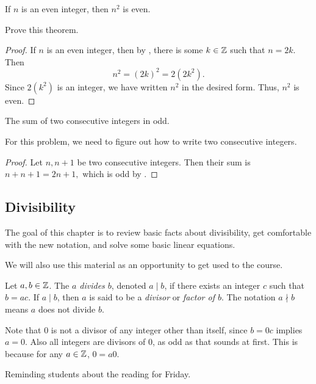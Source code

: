\documentclass{../ximera}
\begin{document}
 
\begin{thm*}\label{thm:even-sq}
  If $n$ is an even integer, then $n^2$ is even.
\end{thm*}

\begin{br}\label{br:sqr-evens}
  Prove this theorem.

  \begin{proof}
    If $n$ is an even integer, then by , there is some $k\in\mathbb Z$ such that $n=2k$. Then \[n^2=(2k)^2=2(2k^2).\] Since $2(k^2)$ is an integer, we have written $n^2$ in the desired form. Thus, $n^2$ is even.
  \end{proof}
\end{br}
 
\begin{thm*}\label{thm:sum-odd}
  The sum of two consecutive integers in odd.
\end{thm*}
For this problem, we need to figure out how to write two consecutive integers. 
\begin{proof}
  Let $n,n+1$ be two consecutive integers. Then their sum is $n+n+1=2n+1,$ which is odd by .
\end{proof}

\subsection{Divisibility}%

The goal of this chapter is to review basic facts about divisibility, get comfortable with the new notation, and solve some basic linear equations.

We will also use this material as an opportunity to get used to the course. 

\begin{defn}[$a$ divides $b$]\label{defn:divides}
 Let $a,b\in \mathbb Z$. The \emph{$a$ divides $b$}, denoted $a\mid b$,  if there exists an integer $c$ such that $b=ac$. If $a\mid b$, then $a$ is said to be a \emph{divisor} or \emph{factor of $b$}. The notation $a\nmid b$ means $a$ does not divide $b$.
\end{defn}

Note that 0 is not a divisor of any integer other than itself, since $b=0c$ implies $a=0$. Also all integers are divisors of 0, as odd as that sounds at first. This is because for any $a\in\mathbb Z$, $0=a0$. 


Reminding students about the reading for Friday.

\end{document}
